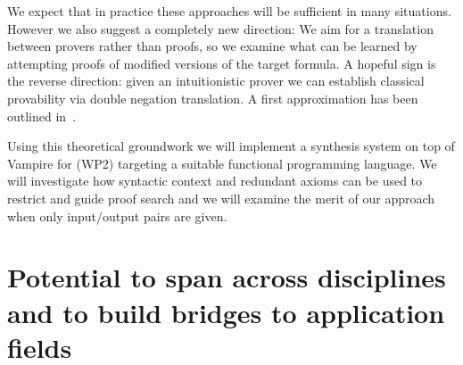 \documentclass[a4paper,12pt]{article}
\begin{document}
	We expect that in practice these approaches will be sufficient in many situations. However we also suggest a completely new direction: We aim for a translation between provers rather than proofs, so we examine what can be learned by attempting proofs of modified versions of the target formula. A hopeful sign is the reverse direction: given an intuitionistic prover we can establish classical provability via double negation translation. A first approximation has been outlined in~\cite{RDNT}.
	
	Using this theoretical groundwork we will implement a synthesis system on top of Vampire for (WP2) targeting a suitable functional programming language. We will investigate how syntactic context and redundant
	axioms can be used to restrict and guide proof search and we will examine the merit of our approach when only input/output pairs are given.
	
	
	\section{Potential to span across disciplines and to build bridges to application fields}
	
	
	
	
\end{document}
